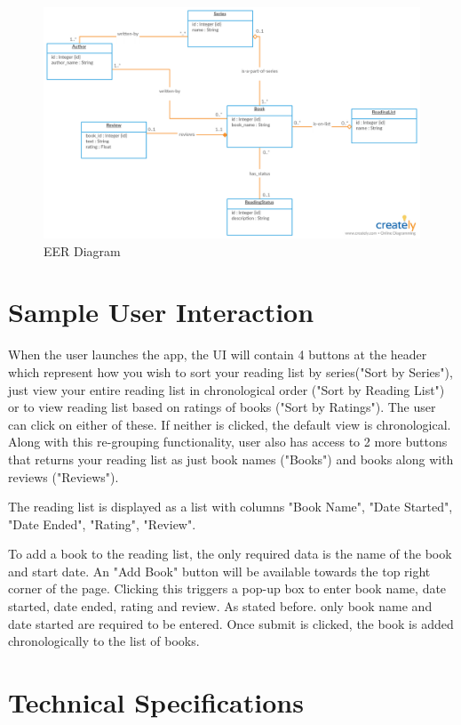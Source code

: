 \documentclass{article}
\begin{document}
\begin{figure}[h]
  \centering
  \includegraphics[width=\textwidth]{uml}
  \caption{EER Diagram}
\end{figure}

\section*{Sample User Interaction}

When the user launches the app, the UI will contain 4 buttons at the header which 
represent how you wish to sort your reading list by series("Sort by Series"), just 
view your entire reading list in chronological order ("Sort by Reading List") or 
to view reading list based on ratings of books ("Sort by Ratings"). The user can 
click on either of these. If neither is clicked, the default view is chronological. 
Along with this re-grouping functionality, user also has access to 2 more buttons 
that returns your reading list as just book names ("Books") and books along with 
reviews ("Reviews").

The reading list is displayed as a list with columns "Book Name", "Date Started", 
"Date Ended", "Rating", "Review".

To add a book to the reading list, the only required data is the name of the book 
and start date. 
An "Add Book" button will be available towards the top right corner of the page. 
Clicking this triggers a pop-up box to enter book name, date started, date ended, 
rating and review. As stated before. only book name and date started are required 
to be entered. Once submit is clicked, the book is added chronologically to the 
list of books.

\section*{Technical Specifications}
\end{document}
